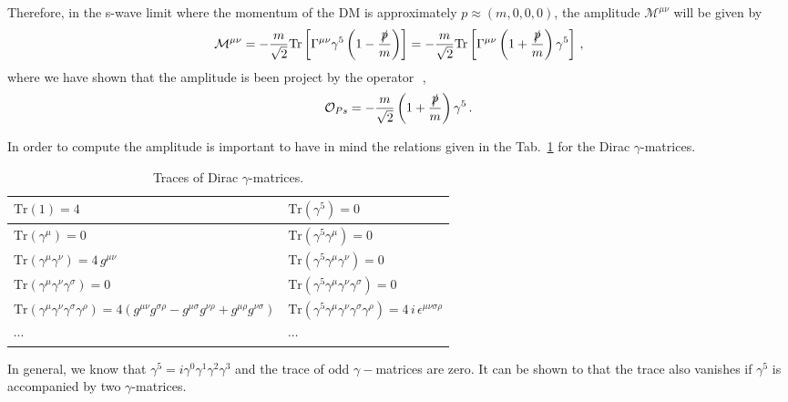 Therefore, in the s-wave limit where the momentum of the DM is approximately $p\approx (m,0,0,0)$, the amplitude $\mathcal{M}^{\mu\nu}$ will be given by
\begin{align}
\label{eq:projector}
\mathcal{M}^{\mu\nu}=-\dfrac{m}{\sqrt{2}}\text{Tr}\left[\Gamma^{\mu\nu}\gamma^5\left(1-\dfrac{\slashed{p}}{m}\right)\right]
=-\dfrac{m}{\sqrt{2}}\text{Tr}\left[\Gamma^{\mu\nu}\left(1+\dfrac{\slashed{p}}{m}\right)\gamma^5\right]\,,
\end{align}  
where we have shown that the amplitude is been project by the operator~\cite{Bergstrom:1997fh}\,,
\begin{align}
\mathcal{O}_{Ps}=-\dfrac{m}{\sqrt{2}}\left(1+\dfrac{\slashed{p}}{m}\right)\gamma^5\,.
\end{align}

%
In order to compute the amplitude is important to have in mind the relations given in the Tab.~\ref{tab:traza-gammas} for the Dirac $\gamma$-matrices.
%
\begin{table}[h]
\centering
\begin{tabular}{|l|l|}\hline
$\text{Tr}(1)=4$ & $\text{Tr}(\gamma^5)=0$ \\ \hline
$\text{Tr}(\gamma^{\mu})=0$ & $\text{Tr}(\gamma^5\gamma^{\mu})=0$ \\ \hline
$\text{Tr}(\gamma^{\mu}\gamma^{\nu})=4\,g^{\mu\nu}$ & $\text{Tr}(\gamma^5\gamma^{\mu}\gamma^{\nu})=0$ \\ \hline
$\text{Tr}(\gamma^{\mu}\gamma^{\nu}\gamma^{\sigma})=0$ & $\text{Tr}(\gamma^5\gamma^{\mu}\gamma^{\nu}\gamma^{\sigma})=0$ \\ \hline
$\text{Tr}(\gamma^{\mu}\gamma^{\nu}\gamma^{\sigma}\gamma^{\rho})=4\left(g^{\mu\nu}g^{\sigma\rho}-g^{\mu\sigma}g^{\nu\rho}+g^{\mu\rho}g^{\nu\sigma}\right)$ & $\text{Tr}(\gamma^5\gamma^{\mu}\gamma^{\nu}\gamma^{\sigma}\gamma^{\rho})=4\,i\,\epsilon^{\mu\nu\sigma\rho}$ \\ \hline
$\cdots$ & $\cdots$ \\\hline
\end{tabular}
  \caption{Traces of Dirac $\gamma$-matrices.}
  \label{tab:traza-gammas}
\end{table}
%
In general, we know that $\gamma^5=i\gamma^0\gamma^1\gamma^2\gamma^3$ and the trace of odd $\gamma-$matrices are zero. It can be shown to that the trace also vanishes if $\gamma^5$ is accompanied by two $\gamma$-matrices. 

